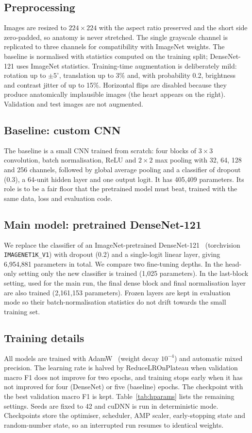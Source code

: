\documentclass[conference]{IEEEtran}
\begin{document}
\subsection{Preprocessing}
Images are resized to $224\times224$ with the aspect ratio preserved and the short side zero-padded, so anatomy is never stretched. The single grayscale channel is replicated to three channels for compatibility with ImageNet weights. The baseline is normalised with statistics computed on the training split; DenseNet-121 uses ImageNet statistics. Training-time augmentation is deliberately mild: rotation up to $\pm5^\circ$, translation up to 3\% and, with probability 0.2, brightness and contrast jitter of up to 15\%. Horizontal flips are disabled because they produce anatomically implausible images (the heart appears on the right). Validation and test images are not augmented.

\subsection{Baseline: custom CNN}
The baseline is a small CNN trained from scratch: four blocks of $3\times3$ convolution, batch normalisation, ReLU and $2\times2$ max pooling with 32, 64, 128 and 256 channels, followed by global average pooling and a classifier of dropout (0.3), a 64-unit hidden layer and one output logit. It has 405,409 parameters. Its role is to be a fair floor that the pretrained model must beat, trained with the same data, loss and evaluation code.

\subsection{Main model: pretrained DenseNet-121}
We replace the classifier of an ImageNet-pretrained DenseNet-121~\cite{huang2017,deng2009} (torchvision \texttt{IMAGENET1K\_V1}) with dropout (0.2) and a single-logit linear layer, giving 6,954,881 parameters in total. We compare two fine-tuning depths. In the head-only setting only the new classifier is trained (1,025 parameters). In the last-block setting, used for the main run, the final dense block and final normalisation layer are also trained (2,161,153 parameters). Frozen layers are kept in evaluation mode so their batch-normalisation statistics do not drift towards the small training set.

\subsection{Training details}
All models are trained with AdamW~\cite{loshchilov2019} (weight decay $10^{-4}$) and automatic mixed precision. The learning rate is halved by ReduceLROnPlateau when validation macro F1 does not improve for two epochs, and training stops early when it has not improved for four (DenseNet) or five (baseline) epochs. The checkpoint with the best validation macro F1 is kept. Table~\ref{tab:hparams} lists the remaining settings. Seeds are fixed to 42 and cuDNN is run in deterministic mode. Checkpoints store the optimiser, scheduler, AMP scaler, early-stopping state and random-number state, so an interrupted run resumes to identical weights.
\end{document}
